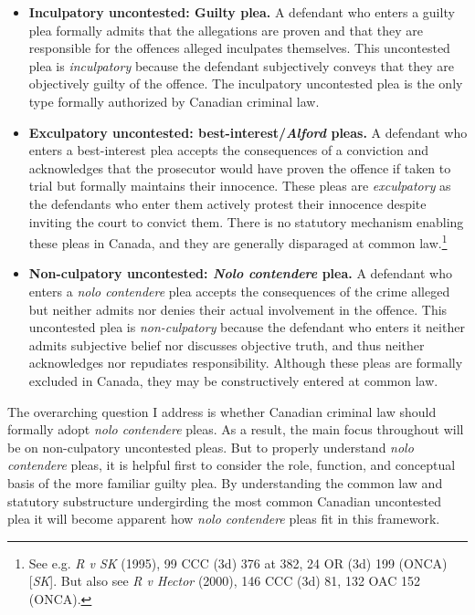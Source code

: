 \begin{itemize}

    \item \textbf{Inculpatory uncontested: Guilty plea.} A defendant who enters a guilty plea formally admits that the allegations are proven and that they are responsible for the offences alleged inculpates themselves. This uncontested plea is \textit{inculpatory} because the defendant subjectively conveys that they are objectively guilty of the offence. The inculpatory uncontested plea is the only type formally authorized by Canadian criminal law.

    \item \textbf{Exculpatory uncontested: best-interest/\textit{Alford} pleas.} A defendant who enters a best-interest plea accepts the consequences of a conviction and acknowledges that the prosecutor would have proven the offence if taken to trial but formally maintains their innocence. These pleas are \textit{exculpatory} as the defendants who enter them actively protest their innocence despite inviting the court to convict them. There is no statutory mechanism enabling these pleas in Canada, and they are generally disparaged at common law.\footnote{See e.g. \textit{R v SK} (1995), 99 CCC (3d) 376 at 382, 24 OR (3d) 199 (ONCA) [\textit{SK}]. But also see \textit{R v Hector} (2000), 146 CCC (3d) 81, 132 OAC 152 (ONCA).}
    
    \item \textbf{Non-culpatory uncontested: \textit{Nolo contendere} plea.} A defendant who enters a \textit{nolo contendere} plea accepts the consequences of the crime alleged but neither admits nor denies their actual involvement in the offence. This uncontested plea is \textit{non-culpatory} because the defendant who enters it neither admits subjective belief nor discusses objective truth, and thus neither acknowledges nor repudiates responsibility. Although these pleas are formally excluded in Canada, they may be constructively entered at common law.
    
\end{itemize}

The overarching question I address is whether Canadian criminal law should formally adopt \textit{nolo contendere} pleas. As a result, the main focus throughout will be on non-culpatory uncontested pleas. But to properly understand \textit{nolo contendere} pleas, it is helpful first to consider the role, function, and conceptual basis of the more familiar guilty plea. By understanding the common law and statutory substructure undergirding the most common Canadian uncontested plea it will become apparent how \textit{nolo contendere} pleas fit in this framework.